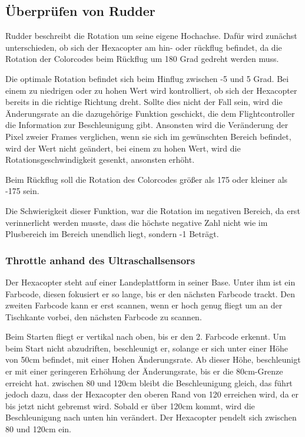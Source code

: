     \subsection*{Überprüfen von Rudder}
    Rudder beschreibt die Rotation um seine eigene Hochachse. Dafür wird zunächst unterschieden, ob sich der Hexacopter am hin- oder rückflug befindet, da die Rotation der Colorcodes beim Rückflug um 180 Grad gedreht werden muss.

    Die optimale Rotation befindet sich beim Hinflug zwischen -5 und 5 Grad.
    Bei einem zu niedrigen oder zu hohen Wert wird kontrolliert, ob sich der Hexacopter bereits in die richtige Richtung dreht.
    Sollte dies nicht der Fall sein, wird die Änderungsrate an die dazugehörige Funktion geschickt, die dem Flightcontroller die Information zur Beschleunigung gibt.
    Ansonsten wird die Veränderung der Pixel zweier Frames verglichen, wenn sie sich im gewünschten Bereich befindet, wird der Wert nicht geändert, bei einem zu hohen Wert, wird die Rotationsgeschwindigkeit gesenkt, ansonsten erhöht.

    Beim Rückflug soll die Rotation des Colorcodes größer als 175 oder kleiner als -175 sein.

    Die Schwierigkeit dieser Funktion, war die Rotation im negativen Bereich, da erst verinnerlicht werden musste, dass die höchste negative Zahl nicht wie im Plusbereich im Bereich unendlich liegt, sondern -1 Beträgt.


    \subsubsection{Throttle anhand des Ultraschallsensors}
    Der Hexacopter steht auf einer Landeplattform in seiner Base. Unter ihm ist ein Farbcode, diesen fokusiert er so lange, bis er den nächsten Farbcode trackt. Den zweiten Farbcode kann er erst scannen, wenn er hoch genug fliegt um an der Tischkante vorbei, den nächsten Farbcode zu scannen.

    Beim Starten fliegt er vertikal nach oben, bis er den 2. Farbcode erkennt. Um beim Start nicht abzudriften, beschleunigt er, solange er sich unter einer Höhe von 50cm befindet, mit einer Hohen Änderungsrate. Ab dieser Höhe, beschleunigt er mit einer geringeren Erhöhung der Änderungsrate, bis er die 80cm-Grenze erreicht hat.
    zwischen 80 und 120cm bleibt die Beschleunigung gleich, das führt jedoch dazu, dass der Hexacopter den oberen Rand von 120 erreichen wird, da er bis jetzt nicht gebremst wird. Sobald er über 120cm kommt, wird die Beschleunigung nach unten hin verändert. Der Hexacopter pendelt sich zwischen 80 und 120cm ein.


